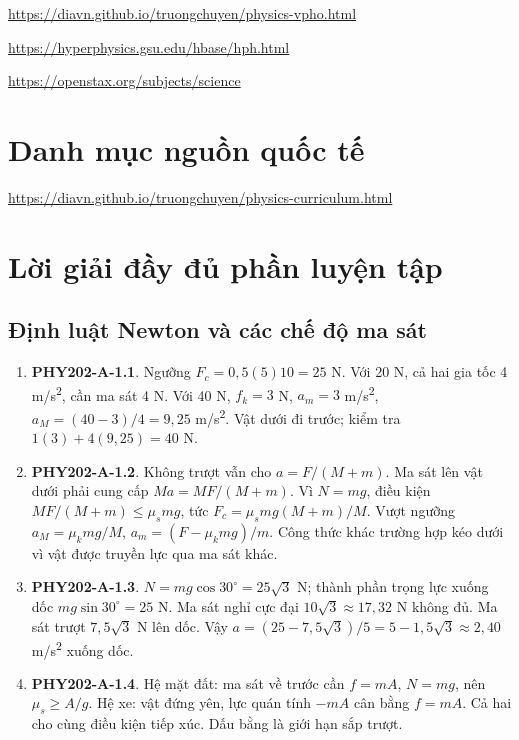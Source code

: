 \documentclass[11pt,a4paper,openany]{book}
\begin{document}
\url{https://diavn.github.io/truongchuyen/physics-vpho.html}

\url{https://hyperphysics.gsu.edu/hbase/hph.html}

\url{https://openstax.org/subjects/science}
\chapter*{Danh mục nguồn quốc tế}
\url{https://diavn.github.io/truongchuyen/physics-curriculum.html}
\appendix
\chapter{Lời giải đầy đủ phần luyện tập}
\section{Định luật Newton và các chế độ ma sát}
\begin{enumerate}
\item \textbf{PHY202-A-1.1}. Ngưỡng $F_c=0{,}5(5)10=25$ N. Với 20 N, cả hai gia tốc 4 m/s\textsuperscript{2}, cần ma sát 4 N. Với 40 N, $f_k=3$ N, $a_m=3$ m/s\textsuperscript{2}, $a_M=(40-3)/4=9{,}25$ m/s\textsuperscript{2}. Vật dưới đi trước; kiểm tra $1(3)+4(9{,}25)=40$ N.
\item \textbf{PHY202-A-1.2}. Không trượt vẫn cho $a=F/(M+m)$. Ma sát lên vật dưới phải cung cấp $Ma=MF/(M+m)$. Vì $N=mg$, điều kiện $MF/(M+m)\le\mu_smg$, tức $F_c=\mu_smg(M+m)/M$. Vượt ngưỡng $a_M=\mu_kmg/M$, $a_m=(F-\mu_kmg)/m$. Công thức khác trường hợp kéo dưới vì vật được truyền lực qua ma sát khác.
\item \textbf{PHY202-A-1.3}. $N=mg\cos30^\circ=25\sqrt3$ N; thành phần trọng lực xuống dốc $mg\sin30^\circ=25$ N. Ma sát nghỉ cực đại $10\sqrt3\approx17{,}32$ N không đủ. Ma sát trượt $7{,}5\sqrt3$ N lên dốc. Vậy $a=(25-7{,}5\sqrt3)/5=5-1{,}5\sqrt3\approx2{,}40$ m/s\textsuperscript{2} xuống dốc.
\item \textbf{PHY202-A-1.4}. Hệ mặt đất: ma sát về trước cần $f=mA$, $N=mg$, nên $\mu_s\ge A/g$. Hệ xe: vật đứng yên, lực quán tính $-mA$ cân bằng $f=mA$. Cả hai cho cùng điều kiện tiếp xúc. Dấu bằng là giới hạn sắp trượt.
\end{enumerate}
\end{document}
